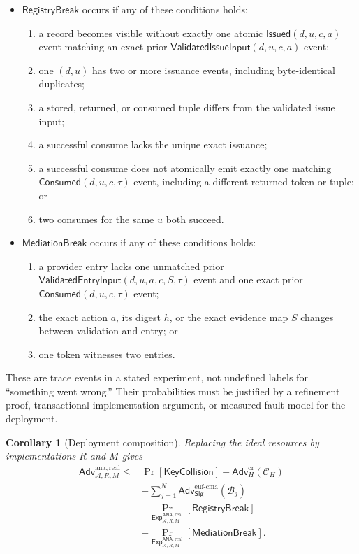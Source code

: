 \documentclass[10pt]{article}
\newtheorem{corollary}{Corollary}
\newcommand{\Adv}{\mathsf{Adv}}
\newcommand{\ANA}{\mathsf{ANA}}
\begin{document}
\begin{itemize}[leftmargin=*]
\item $\mathsf{RegistryBreak}$ occurs if any of these conditions holds:
  \begin{enumerate}[label=(R\arabic*),leftmargin=2.1em]
  \item a record becomes visible without exactly one atomic
  $\mathsf{Issued}(d,u,c,a)$ event matching an exact prior
  $\mathsf{ValidatedIssueInput}(d,u,c,a)$ event;
  \item one $(d,u)$ has two or more issuance events, including byte-identical
  duplicates;
  \item a stored, returned, or consumed tuple differs from the validated issue
  input;
  \item a successful consume lacks the unique exact issuance;
  \item a successful consume does not atomically emit exactly one matching
  $\mathsf{Consumed}(d,u,c,\tau)$ event, including a different returned token or
  tuple; or
  \item two consumes for the same $u$ both succeed.
  \end{enumerate}
\item $\mathsf{MediationBreak}$ occurs if any of these conditions holds:
  \begin{enumerate}[label=(M\arabic*),leftmargin=2.1em]
  \item a provider entry lacks one unmatched prior
  $\mathsf{ValidatedEntryInput}(d,u,a,c,S,\tau)$ event and one exact prior
  $\mathsf{Consumed}(d,u,c,\tau)$ event;
  \item the exact action $a$, its digest $h$, or the exact evidence map $S$
  changes between validation and entry; or
  \item one token witnesses two entries.
  \end{enumerate}
\end{itemize}

These are trace events in a stated experiment, not undefined labels for
``something went wrong.'' Their probabilities must be justified by a refinement
proof, transactional implementation argument, or measured fault model for the
deployment.

\begin{corollary}[Deployment composition]
Replacing the ideal resources by implementations $R$ and $M$ gives
\[
\begin{aligned}
 \Adv^{\mathrm{ana,real}}_{\mathcal A,R,M}
 {}\leq{}& \Pr[\mathsf{KeyCollision}]
 +\Adv^{\mathrm{cr}}_H(\mathcal C_H)\\
 &+\sum_{j=1}^{N}\Adv^{\mathrm{euf\mbox{-}cma}}_{\mathsf{Sig}}(\mathcal B_j)\\
 &+\Pr_{\mathsf{Exp}^{\ANA,\mathrm{real}}_{\mathcal A,R,M}}[\mathsf{RegistryBreak}]\\
 &+\Pr_{\mathsf{Exp}^{\ANA,\mathrm{real}}_{\mathcal A,R,M}}[\mathsf{MediationBreak}].
\end{aligned}
\]
\end{corollary}
\end{document}
